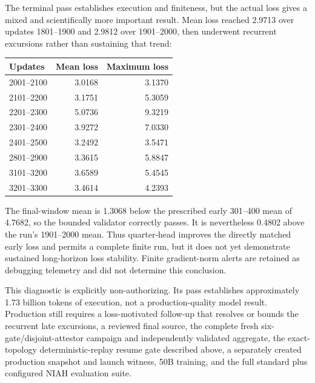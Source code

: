 \documentclass[11pt]{article}
\begin{document}
The terminal pass establishes execution and finiteness, but the actual loss gives a mixed and
scientifically more important result.  Mean loss reached 2.9713 over updates 1801--1900 and 2.9812
over 1901--2000, then underwent recurrent excursions rather than sustaining that trend:
\begin{center}
\begin{tabular}{@{}lrr@{}}
  \toprule
  Updates & Mean loss & Maximum loss \\
  \midrule
  2001--2100 & 3.0168 & 3.1370 \\
  2101--2200 & 3.1751 & 5.3059 \\
  2201--2300 & 5.0736 & 9.3219 \\
  2301--2400 & 3.9272 & 7.0330 \\
  2401--2500 & 3.2492 & 3.5471 \\
  2801--2900 & 3.3615 & 5.8847 \\
  3101--3200 & 3.6589 & 5.4545 \\
  3201--3300 & 3.4614 & 4.2393 \\
  \bottomrule
\end{tabular}
\end{center}
The final-window mean is 1.3068 below the prescribed early 301--400 mean of 4.7682, so the bounded
validator correctly passes.  It is nevertheless 0.4802 above the run's 1901--2000 mean.  Thus
quarter-head improves the directly matched early loss and permits a complete finite run, but it
does not yet demonstrate sustained long-horizon loss stability.  Finite gradient-norm alerts are
retained as debugging telemetry and did not determine this conclusion.

This diagnostic is explicitly non-authorizing.  Its pass establishes approximately 1.73 billion
tokens of execution, not a production-quality model result.  Production still requires a
loss-motivated follow-up that resolves or bounds the recurrent late excursions, a reviewed final
source, the complete fresh six-gate/disjoint-attestor campaign and independently validated
aggregate, the exact-topology deterministic-replay resume gate described above, a separately
created production snapshot and launch witness, 50B training, and the full standard plus configured
NIAH evaluation suite.
\end{document}

